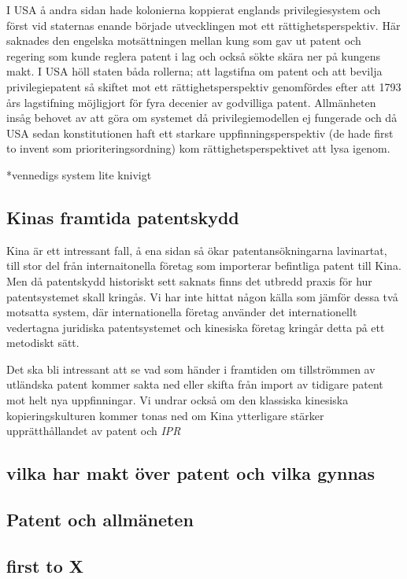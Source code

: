 I USA å andra sidan hade kolonierna koppierat englands privilegiesystem och först vid staternas enande började utvecklingen mot ett rättighetsperspektiv. Här saknades den engelska motsättningen mellan kung som gav ut patent och regering som kunde reglera patent i lag och också sökte skära ner på kungens makt. I USA höll staten båda rollerna; att lagstifna om patent och att bevilja privilegiepatent så skiftet mot ett rättighetsperspektiv genomfördes efter att 1793 års lagstifning möjligjort för fyra decenier av godvilliga patent. Allmänheten insåg behovet av att göra om systemet då privilegiemodellen ej fungerade och då USA sedan konstitutionen haft ett starkare uppfinningsperspektiv (de hade first to invent som prioriteringsordning) kom rättighetsperspektivet att lysa igenom.


*vennedigs system lite knivigt

\subsection{Kinas framtida patentskydd}

Kina är ett intressant fall, å ena sidan så ökar patentansökningarna lavinartat, till stor del från internaitonella företag som importerar befintliga patent till Kina. Men då patentskydd historiskt sett saknats finns det  utbredd praxis för hur patentsystemet skall kringås. Vi har inte hittat någon källa som jämför dessa två motsatta system, där internationella företag använder det internationellt vedertagna juridiska patentsystemet och kinesiska företag kringår detta på ett metodiskt sätt. 

Det ska bli intressant att se vad som händer i framtiden om tillströmmen av utländska patent kommer sakta ned eller skifta från import av tidigare patent mot helt nya uppfinningar. Vi undrar också om den klassiska kinesiska kopieringskulturen kommer tonas ned om Kina ytterligare stärker upprätthållandet av patent och \emph{IPR}



\subsection*{vilka har makt över patent och vilka gynnas}


\subsection*{Patent och allmäneten}


\subsection{first to X}


